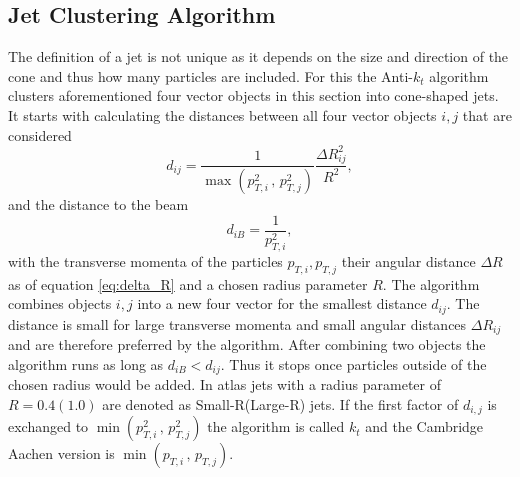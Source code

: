 \subsection{Jet Clustering Algorithm}\label{sec:anti_kt}
The definition of a jet is not unique as it depends on the size and direction of the cone and thus how many particles are included. For this the Anti-$k_t$ algorithm \citep{cacciari2008anti} clusters aforementioned four vector objects in this section into cone-shaped jets. It starts with calculating the distances between all four vector objects $i,j$ that are considered
\begin{equation}
  d_{ij}=\frac{1}{\max(p_{T,i}^{2}\,,\,p_{T,j}^{2})} \frac{\Delta R_{ij}^2}{R^2},
\end{equation}
and the distance to the beam
\begin{equation}
  d_{iB}=\frac{1}{p_{T,i}^{2}},
\end{equation}
with the transverse momenta of the particles $p_{T,i},p_{T,j}$ their angular distance $\Delta R$ as of equation \ref{eq:delta_R} and a chosen radius parameter $R$. The algorithm combines objects $i,j$ into a new four vector for the smallest distance $d_{ij}$. The distance is small for large transverse momenta \pt and small angular distances $\Delta R_{ij}$ and are therefore preferred by the algorithm. After combining two objects the algorithm runs as long as $d_{iB}<d_{ij}$. Thus it stops once particles outside of the chosen radius would be added. In \ac{atlas} jets with a radius parameter of $R=0.4 (1.0)$ are denoted as Small-R(Large-R) jets. If the first factor of $d_{i,j}$ is exchanged to $\min(p_{T,i}^{2}\,,\,p_{T,j}^{2})$ the algorithm is called $k_t$ and the Cambridge Aachen version is $\min(p_{T,i}\,,\,p_{T,j})$.



